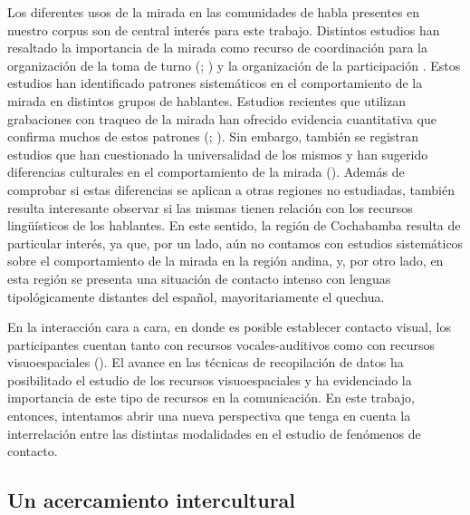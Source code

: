 \documentclass[output=paper]{../langscibook}
\begin{document}
Los diferentes usos de la mirada en las comunidades de habla presentes en nuestro corpus son de central interés para este trabajo. Distintos estudios han resaltado la importancia de la mirada como recurso de coordinación para la organización de la toma de turno (\citealt{Kendon1967}; \citealt{Rossano2012}) y la organización de la participación \citep{Goodwin1981}. Estos estudios han identificado patrones sistemáticos en el comportamiento de la mirada en distintos grupos de hablantes. Estudios recientes que utilizan grabaciones con traqueo de la mirada han ofrecido evidencia cuantitativa que confirma muchos de estos patrones (\citealt{BrôneEtAl2017}; \citealt{ZimaEtAl2019}). Sin embargo, también se registran estudios que han cuestionado la universalidad de los mismos y han sugerido diferencias culturales en el comportamiento de la mirada (\citealt{RossanoEtAl2009}). Además de comprobar si estas diferencias se aplican a otras regiones no estudiadas, también resulta interesante observar si las mismas tienen relación con los recursos lingüísticos de los hablantes. En este sentido, la región de Cochabamba resulta de particular interés, ya que, por un lado, aún no contamos con estudios sistemáticos sobre el comportamiento de la mirada en la región andina, y, por otro lado, en esta región se presenta una situación de contacto intenso con lenguas tipológicamente distantes del español, mayoritariamente el quechua.

En la interacción cara a cara, en donde es posible establecer contacto visual, los participantes cuentan tanto con recursos vocales-auditivos como con recursos visuoespaciales (\citealt{StiversSidnell2005}). El avance en las técnicas de recopilación de datos ha posibilitado el estudio de los recursos visuoespaciales y ha evidenciado la importancia de este tipo de recursos en la comunicación. En este trabajo, entonces, intentamos abrir una nueva perspectiva que tenga en cuenta la interrelación entre las distintas modalidades en el estudio de fenómenos de contacto.

\subsection{Un acercamiento intercultural}
\end{document}
